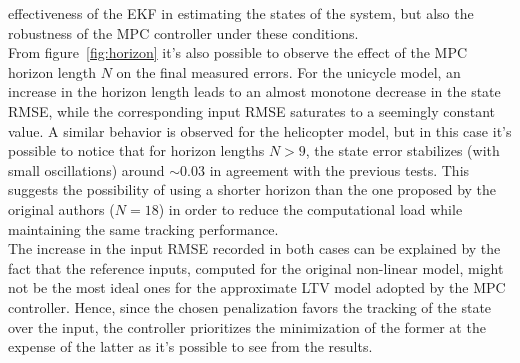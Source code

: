 \documentclass[../main.tex]{subfiles}
\begin{document}
effectiveness of the EKF in estimating the states of the system, but also the
robustness of the MPC controller under these conditions.\\
From figure~\ref{fig:horizon} it's also possible to observe the effect of the
MPC horizon length $N$ on the final measured errors. For the unicycle model, an
increase in the horizon length leads to an almost monotone decrease in the state RMSE,
while the corresponding input RMSE saturates to a seemingly constant value.
A similar behavior is observed for the helicopter model, but in this case it's
possible to notice that for horizon lengths $N > 9$, the state error stabilizes
(with small oscillations) around $\sim 0.03$ in agreement with the previous tests.
This suggests the possibility of using a shorter horizon than the one proposed
by the original authors ($N=18$) in order to reduce the computational load while
maintaining the same tracking performance.\\
The increase in the input RMSE recorded in both cases can be explained by the
fact that the reference inputs, computed for the original non-linear model,
might not be the most ideal ones for the approximate LTV model adopted by the
MPC controller. Hence, since the chosen penalization favors the tracking of the state over the input, the controller prioritizes the minimization of the former at the expense of the latter as it's possible to see from the results.
\end{document}
